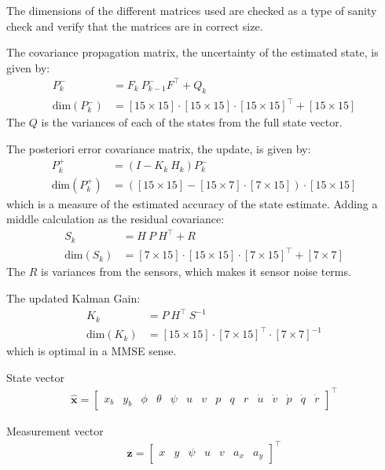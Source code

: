 The dimensions of the different matrices used are checked as a type of sanity check and verify that the matrices are in correct size.

The covariance propagation matrix, the uncertainty of the estimated state, is given by:
\begin{align}
P_k^- &= F_k\ P_{k-1}^-F^\top + Q_k\\
\text{dim}(P_k^-) &= [15 \times 15]\cdot [15 \times 15]\cdot [15 \times 15]^\top + [15 \times 15]
\end{align}
The $Q$ is the variances of each of the states from the full state vector.

The posteriori error covariance matrix, the update, is given by:
\begin{align}
P_k^+ &= (I - K_k\ H_k)P_k^-\\
\text{dim}(P_k^+) &= ([15 \times 15] - [15 \times 7]\cdot [7 \times 15])\cdot [15 \times 15]
\end{align}
which is a measure of the estimated accuracy of the state estimate. Adding a middle calculation as the residual covariance:
\begin{align}
S_k &= H\ P\ H^\top + R\\
\text{dim}(S_k) &= [7 \times 15]\cdot [15 \times 15]\cdot [7 \times 15]^\top + [7 \times 7]
\end{align}
The $R$ is variances from the sensors, which makes it sensor noise terms.

The updated Kalman Gain:
\begin{align}
K_k &= P\ H^\top\ S^{-1}\\
\text{dim}(K_k) &= [15 \times 15]\cdot [7 \times 15]^\top\cdot [7 \times 7]^{-1}
\end{align}
which is optimal in a \ac{MMSE} sense. %

State vector
\begin{align}
\hat{\mathbf x}=
\begin{bmatrix}
x_b & y_b & \phi & \theta & \psi & u & v & p & q & r & \dot u & \dot v & \dot p & \dot q & \dot r
\end{bmatrix}^\top
\end{align}

Measurement vector
\begin{align}
\mathbf z=
\begin{bmatrix}
x & y & \psi & u & v & a_x & a_y
\end{bmatrix}^\top
\end{align}

